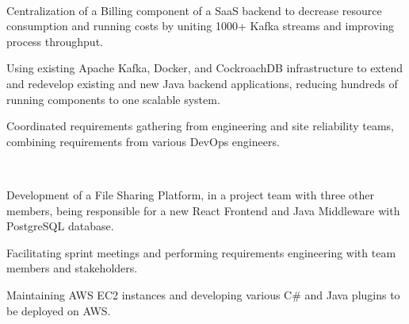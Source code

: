 \documentclass[]{deedy-resume-openfont}
\begin{document}
\sectionsep{}\\ 
\begin{tightemize}
	\item Centralization of a Billing component of a SaaS backend to decrease resource consumption and running costs by uniting 1000+ Kafka streams and improving process throughput.
	\item Using existing Apache Kafka, Docker, and CockroachDB infrastructure to extend and redevelop existing and new Java backend applications, reducing hundreds of running components to one scalable system.
	\item Coordinated requirements gathering from engineering and site reliability teams, combining requirements from various DevOps engineers.
\end{tightemize}

\sectionsep

\\ 
\begin{tightemize}
	\item Development of a File Sharing Platform, in a project team with three other members, being responsible for a new React Frontend and Java Middleware with PostgreSQL database.
	\item Facilitating sprint meetings and performing requirements engineering with team members and stakeholders.
	\item Maintaining AWS EC2 instances and developing various C\# and Java plugins to be deployed on AWS.
\end{tightemize}

\sectionsep

\\ 

\sectionsep



%
%
\end{document}

